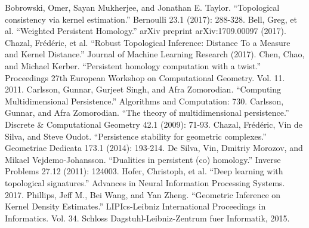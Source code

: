 \documentclass[11pt]{article}
\theoremstyle{plain}
\theoremstyle{definition}
\theoremstyle{definition}
\theoremstyle{definition}
\theoremstyle{definition}
\theoremstyle{definition}
\theoremstyle{definition}
\theoremstyle{definition}
\theoremstyle{definition}
\begin{document}
\begin{thebibliography}{99}
 Bobrowski, Omer, Sayan Mukherjee, and Jonathan E. Taylor. ``Topological consistency via kernel estimation.'' Bernoulli 23.1 (2017): 288-328.
 Bell, Greg, et al. ``Weighted Persistent Homology.'' arXiv preprint arXiv:1709.00097 (2017).
 Chazal, Frédéric, et al. ``Robust Topological Inference: Distance To a Measure and Kernel Distance.'' Journal of Machine Learning Research (2017).
 Chen, Chao, and Michael Kerber. ``Persistent homology computation with a twist.'' Proceedings 27th European Workshop on Computational Geometry. Vol. 11. 2011.
 Carlsson, Gunnar, Gurjeet Singh, and Afra Zomorodian. ``Computing Multidimensional Persistence.'' Algorithms and Computation: 730.
Carlsson, Gunnar, and Afra Zomorodian. ``The theory of multidimensional persistence.'' Discrete \& Computational Geometry 42.1 (2009): 71-93.
 Chazal, Frédéric, Vin de Silva, and Steve Oudot. ``Persistence stability for geometric complexes.'' Geometriae Dedicata 173.1 (2014): 193-214.
 De Silva, Vin, Dmitriy Morozov, and Mikael Vejdemo-Johansson. ``Dualities in persistent (co) homology.'' Inverse Problems 27.12 (2011): 124003.
 Hofer, Christoph, et al. ``Deep learning with topological signatures.'' Advances in Neural Information Processing Systems. 2017.
Phillips, Jeff M., Bei Wang, and Yan Zheng. ``Geometric Inference on Kernel Density Estimates.'' LIPIcs-Leibniz International Proceedings in Informatics. Vol. 34. Schloss Dagstuhl-Leibniz-Zentrum fuer Informatik, 2015.
\end{thebibliography}
\end{document}

